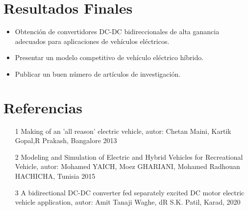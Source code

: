 \documentclass[12pt]{article}
\begin{document}
\section{Resultados Finales}
\begin{itemize}
\item Obtención de convertidores DC-DC  bidireccionales de alta ganancia adecuados para aplicaciones de vehículos eléctricos.
\item Presentar un modelo competitivo de vehículo eléctrico híbrido.
\item Publicar un buen número de artículos de investigación.



\end{itemize}




\section{Referencias}
\begin{itemize}
\item [1] Making of an 'all reason' electric vehicle, autor: Chetan Maini, Kartik Gopal,R Prakash, Bangalore 2013    
\item [2] Modeling and Simulation of Electric and Hybrid Vehicles for Recreational Vehicle, autor: Mohamed YAICH, Moez GHARIANI, Mohamed Radhouan HACHICHA, Tunisia 2015
\item [3] A bidirectional DC-DC converter fed separately excited DC motor electric vehicle application, autor: Amit Tanaji Waghe, dR S.K. Patil, Karad, 2020






\end{itemize}
\end{document}

